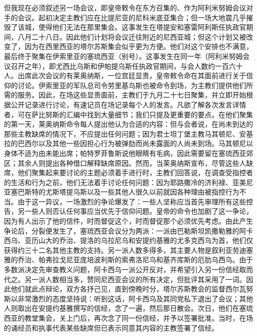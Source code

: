 但我现在必须叙述另一场会议，即皇帝敕令在东方召集的、作为阿利米努姆会议对手的会议。起初决定主教们应在比提尼亚的尼科米底亚集合；但一场大地震几乎摧毁了该城，使得他们无法在那里集会。这事发生在塔提安和塞雷阿利斯任执政官期间，八月二十八日。因此他们计划将会议迁往附近的尼西亚城；但这个计划又被改变了，因为在西里西亚的塔尔苏斯集会似乎更为方便。他们对这个安排也不满意，最后终于聚集在伊索里亚的塞琉西亚（别号）。这事发生在同一年（阿利米努姆会议召开之年），即尤西比乌斯和伊帕提乌斯任执政官期间，与会人数约一百六十人。出席此次会议的有莱奥纳斯，一位宫廷显贵，皇帝敕令命在其面前进行关于信仰的讨论。伊索里亚的军队总司令劳里基乌斯也被命令到场，为主教们提供他们所需的服务。因此，在场这些显贵面前，主教们于九月二十七日聚集，并立即开始根据公开记录进行讨论，有速记员在场记录每个人的发言。凡欲了解各次发言详情者，可在萨比努斯的汇编中找到大量细节；我们只提及更重要的要点。在他们聚集的第一天，莱奥纳斯命令每人提出他认为合适的内容：但与会者说，在尚未到达的那些主教缺席的情况下，不应提出任何问题；因为君士坦丁堡主教马其顿尼、安基拉的巴西尔以及其他一些因担心行为被弹劾而尚未露面的人尚未到场。马其顿尼以身体不适为由未能出席；帕特罗菲鲁斯说他眼睛有毛病，因此需要留在塞琉西亚郊区；其余人则提出各种借口解释缺席原因。然而，当莱奥纳斯宣布，尽管这些人缺席，他们聚集起来要讨论的主题必须着手进行时，主教们回答说，在调查受指控者的生活和行为之前，他们无法着手讨论任何问题：因为耶路撒冷的济利禄、亚美尼亚塞巴斯特的尤斯塔提乌斯以及一些其他人很久以前就因各种理由被指控行为不当。由于这一异议，一场激烈的争论爆发了：一些人坚称应当首先审理所有这些控告，另一些人则否认任何事应当优先于信仰问题。皇帝的命令也加剧了这一争论，因为有人出示了他的信件，时而督促这个，时而督促那个必须优先考虑。由此产生争论后，分裂便发生了，塞琉西亚会议分为两派：一派由巴勒斯坦凯撒勒雅的阿卡西乌、亚历山大的乔治、提洛的乌拉尼乌和安提约基雅的尤多克西乌为首，他们仅获得约三十二名其他主教的支持。另一派人数多得多，其主要人物是叙利亚劳迪塞雅的乔治、帕弗拉戈尼亚庞培波利斯的索弗洛尼乌和基齐库斯的厄肋乌西乌。由于多数派决定先审查教义问题，阿卡西乌一派公开反对，并希望引入另一份信经取而代之。另一派人数相当多，赞同尼西亚会议的所有决定，但批评其采用了一词。因此他们就此点辩论，双方各抒己见，直到傍晚时分，塔尔苏斯教会的监督西尔瓦努斯以非常激烈的态度坚持说：听到这话，阿卡西乌及其同党私下退出了会议；其他人则取出在安提约基雅撰写的信经，念了一遍，然后那日散会。次日，他们在塞琉西亚的教堂集会，关上门后，再次念了同一份信经，并予以签署批准。当时，在场的诵经员和执事代表某些缺席但已表示同意其内容的主教签署了信经。\par

